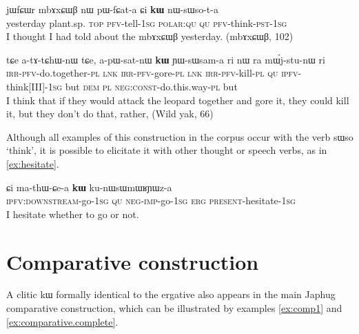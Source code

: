 \documentclass[oldfontcommands,oneside,a4paper,11pt]{article}
\newcommand{\ipa}[1]{{\phon #1}} %
\begin{document}
    \begin{exe} 
 \ex \label{ex:kW.nWsWsota}
\gll 
    \ipa{jɯfɕɯr} 	\ipa{mbɤxɕɯβ} 	\ipa{nɯ} 	\ipa{pɯ-fɕat-a} 	\ipa{ɕi} 	\ipa{\textbf{kɯ}} 	\ipa{nɯ-sɯso-t-a} \\
    yesterday plant.sp. \textsc{top} \textsc{pfv}-tell-\textsc{1sg} \textsc{polar:qu} \textsc{qu} \textsc{pfv}-think-\textsc{pst-1sg} \\
    \glt I thought I had told about the   \ipa{mbɤxɕɯβ} yesterday. (mbɤxɕɯβ, 102)
 \end{exe}  
 

    \begin{exe} 
 \ex \label{ex:kW.YWsWsama}
\gll \ipa{a-kɤ-nɯtshɤβ-nɯ} 	\ipa{tɕe} 	\ipa{a-tɤ-tɕhɯ-nɯ} 	\ipa{tɕe,} 	\ipa{a-pɯ-sat-nɯ} 	\ipa{\textbf{kɯ}} 	\ipa{ɲɯ-sɯsam-a} 	\ipa{ri}  \ipa{nɯ} \ipa{ra} 	\ipa{mɯ́j-stu-nɯ} 	\ipa{ri} \\
\textsc{irr-pfv}-do.together-\textsc{pl} \textsc{lnk} \textsc{irr-pfv}-gore-\textsc{pl} \textsc{lnk } \textsc{irr-pfv}-kill-\textsc{pl} \textsc{qu} \textsc{ipfv}-think[III]-\textsc{1sg} but \textsc{dem} \textsc{pl} \textsc{neg:const}-do.this.way-\textsc{pl}  but \\
\glt I think that if they would attack the leopard together and gore it, they could kill it, but they don't do that, rather, (Wild yak, 66)
 \end{exe} 
 
 
Although all examples of this construction in the corpus occur with the verb \ipa{sɯso} `think', it is possible to elicitate it with other thought or speech verbs, as in \ref{ex:hesitate}.


 \begin{exe} 
 \ex \label{ex:hesitate}
\gll \ipa{chɯ-ɕe-a}   	\ipa{ɕi}   	\ipa{ma-thɯ-ɕe-a}   	\ipa{\textbf{kɯ}}   	\ipa{ku-nɯsɯmɯʁɲɯz-a}          \\
\textsc{ipfv:downstream}-go-\textsc{1sg} \textsc{qu} \textsc{neg}-\textsc{imp}-go-\textsc{1sg} \textsc{erg} \textsc{present}-hesitate-\textsc{1sg}   \\
 \glt  I hesitate whether to go or not.
\end{exe}  

 

\section{Comparative construction} \label{sec:comparative}

A clitic \ipa{kɯ} formally identical to the ergative also appears in the main Japhug comparative construction, which can be illustrated by   examples \ref{ex:comp1} and \ref{ex:comparative.complete}.
\end{document}
